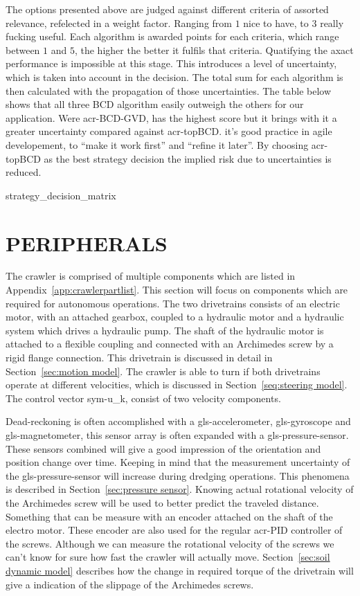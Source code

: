 The options presented above are judged against different criteria of assorted relevance, refelected in a weight factor.
Ranging from \( 1 \) nice to have, to \(  3 \) really fucking useful. Each algorithm is awarded points for each
criteria, which range between \( 1 \) and \( 5 \), the higher the better it fulfils that criteria. Quatifying the axact
performance is impossible at this stage. This introduces a level of uncertainty, which is taken into account in the
decision. The total sum for each algorithm is then calculated with the propagation of those uncertainties. The table
below shows that all three BCD algorithm easily outweigh the others for our application. Were \gls{acr-BCD-GVD}, has the
highest score but it brings with it a greater uncertainty compared against \gls{acr-topBCD}. it's good practice in
agile developement, to ``make it work first'' and ``refine it later''. By choosing \gls{acr-topBCD} as the best strategy
decision the implied risk due to uncertainties is reduced.

{strategy_decision_matrix}

\section{PERIPHERALS}\label{sec:peripherals}

The crawler is comprised of multiple components which are listed in Appendix~\ref{app:crawlerpartlist}. This section
will focus on components which are required for autonomous operations. The two drivetrains consists of an electric
motor, with an attached gearbox, coupled to a hydraulic motor and a hydraulic system which drives a hydraulic pump. The
shaft of the hydraulic motor is attached to a flexible coupling and connected with an Archimedes screw by a rigid flange
connection. This drivetrain is discussed in detail in Section~\ref{sec:motion model}. The crawler is able to turn if
both drivetrains operate at different velocities, which is discussed in Section~\ref{seq:steering model}. The control
vector \gls{sym-u_k}, consist of two velocity components.

Dead-reckoning is often accomplished with a \gls{gls-accelerometer}, \gls{gls-gyroscope} and \gls{gls-magnetometer},
this sensor array is often expanded with a \gls{gls-pressure-sensor}. These sensors combined will give a good impression
of the orientation and position change over time. Keeping in mind that the measurement uncertainty of the
\gls{gls-pressure-sensor} will increase during dredging operations. This phenomena is described in
Section~\ref{sec:pressure sensor}. Knowing actual rotational velocity of the Archimedes screw will be used to better
predict the traveled distance. Something that can be measure with an encoder attached on the shaft of the electro motor.
These encoder are also used for the regular \gls{acr-PID} controller of the screws. Although we can measure the
rotational velocity of the screws we can't know for sure how fast the crawler will actually move. Section~\ref{sec:soil
dynamic model} describes how the change in required torque of the drivetrain will give a indication of the slippage of
the Archimedes screws.

